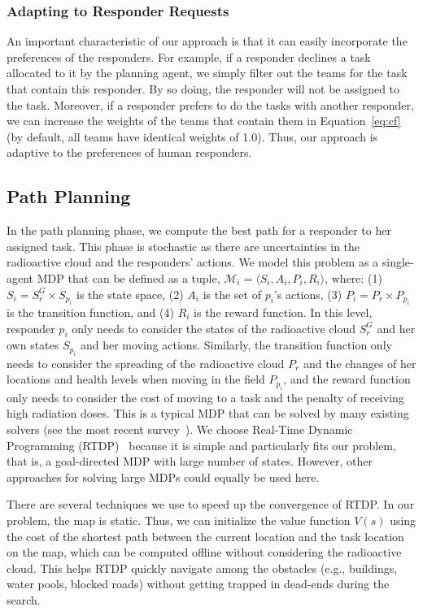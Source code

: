 \subsubsection{Adapting to Responder Requests}\label{sec:adaptive}
\noindent An important characteristic of our approach is that it can easily
incorporate the preferences of the responders. For example, if a
responder declines a task allocated to it by the planning agent, we
simply filter out the teams for the task that contain this
responder. By so doing, the responder will not be assigned to the
task. Moreover, if a responder prefers to do the tasks with another
responder, we can increase the weights of the teams that
contain them in Equation~\ref{eq:cf} (by default, all teams
have identical weights of 1.0). Thus, our approach is adaptive to the
 preferences of human responders.

\subsection{Path Planning}
\label{sec:pathplanning}

\noindent In the path planning phase, we compute the best path for
a responder to her assigned task. This phase is stochastic as there
are uncertainties in the radioactive cloud and the responders'
actions. We model this problem as a single-agent MDP that can be
defined as a tuple, $\mathcal{M}_i = \langle S_i, A_i, P_i, R_i
\rangle$, where: (1) $S_i = S^G_r \times S_{p_i}$ is the state
space, (2) $A_i$ is the set of $p_i$'s actions, (3) $P_i = P_r
\times P_{p_i}$ is the transition function, and (4) $R_i$ is the
reward function. In this level, responder $p_i$ only needs to
consider the states of the radioactive cloud $S^G_r$ and her own
states $S_{p_i}$ and her moving actions. Similarly, the transition
function only needs to consider the spreading of the radioactive
cloud $P_r$ and the changes of her locations and health levels when
moving in the field $P_{p_i}$, and the reward function only needs
to consider the cost of moving to a task and the penalty of
receiving high radiation doses. This is a typical MDP that can be
solved by many existing solvers (see the most recent
survey~\cite{kolobov2012planning}). We choose Real-Time Dynamic
Programming (RTDP)~\cite{barto1995learning} because it is simple
and particularly fits our problem, that is, a goal-directed MDP
with large number of states. However, other approaches for solving
large MDPs  could equally be used here.

There are several techniques we use to speed up the convergence of
RTDP. In our problem, the map is static. Thus, we can initialize
the value function $V(s)$ using the cost of the shortest path
between the current location and the task location on the map, which
can be computed offline without considering the radioactive cloud.
This helps RTDP quickly navigate among the obstacles (e.g.,
buildings, water pools, blocked roads) without getting trapped in
dead-ends during the search. 

